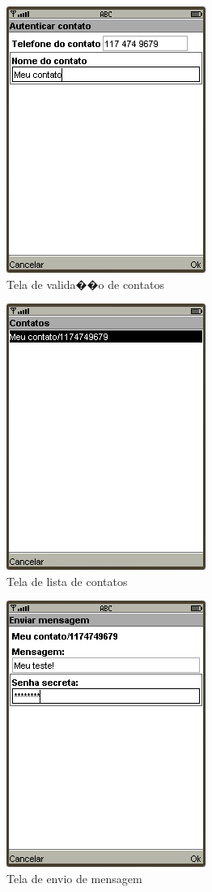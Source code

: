 \documentclass[a4paper,capchap,espacoduplo,normaltoc]{abntepusp}
\begin{document}
\begin{figure}[h]
	\centering
		\includegraphics{figuras/telavalidarcontato.PNG}
	\caption{Tela de valida��o de contatos}
\end{figure}

\begin{figure}[h]
	\centering
		\includegraphics{figuras/telalistacontatos.PNG}
	\caption{Tela de lista de contatos}
\end{figure}

\begin{figure}[h]
	\centering
		\includegraphics{figuras/telaenviarmensagem.PNG}
	\caption{Tela de envio de mensagem}
\end{figure}
\end{document}
